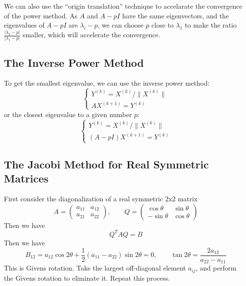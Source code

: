 \documentclass{matharticle}
\begin{document}
We can also use the ``origin translation'' technique to accelarate the convergence of the power method. As $A$ and $A-pI$ have the same eigenvectors, and the eigenvalues of $A-pI$ are $\lambda_i - p$, we can choose $p$ close to $\lambda_1$ to make the ratio $\frac{|\lambda_2 - p|}{|\lambda_1 - p|}$ smaller, which will accelerate the convergence.

\subsection{The Inverse Power Method}
To get the smallest eigenvalue, we can use the inverse power method:
\begin{equation}
	\begin{cases}
		Y^{(k)} = X^{(k)} / \|X^{(k)}\| \\
		A X^{(k+1)} = Y^{(k)}
	\end{cases}
\end{equation}
or the closest eigenvalue to a given number $p$:
\begin{equation}
	\begin{cases}
		Y^{(k)} = X^{(k)} / \|X^{(k)}\| \\
		(A - p I) X^{(k+1)} = Y^{(k)}
	\end{cases}
\end{equation}

\subsection{The Jacobi Method for Real Symmetric Matrices}
First consider the diagonalization of a real symmetric 2x2 matrix
\begin{equation*}
	A = \begin{pmatrix}
		a_{11} & a_{12} \\
		a_{21} & a_{22}
	\end{pmatrix}, \qquad
	Q = \begin{pmatrix}
		\cos \theta  & \sin \theta \\
		-\sin \theta & \cos \theta
	\end{pmatrix}
\end{equation*}
Then we have
\begin{equation*}
	Q^T A Q = B
\end{equation*}
Then we have
\begin{equation*}
	B_{12} = a_{12} \cos 2\theta + \frac{1}{2} (a_{11} - a_{22}) \sin 2\theta = 0, \qquad \tan 2\theta = \frac{2 a_{12}}{a_{22} - a_{11}}
\end{equation*}
This is Givens rotation. Take the largest off-diagonal element $a_{ij}$, and perform the Givens rotation to eliminate it. Repeat this process.
\end{document}
